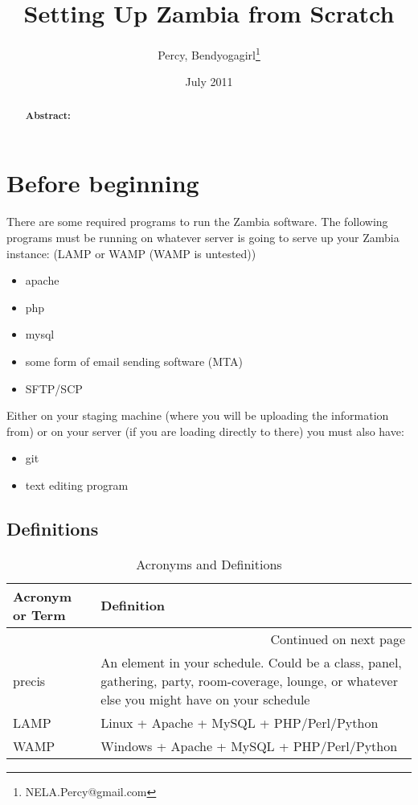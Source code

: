 \documentclass[captions=tablesignature]{scrartcl}
\author{Percy, Bendyogagirl\thanks{NELA.Percy@gmail.com}}
\date{July 2011}
\title{Setting Up Zambia from Scratch}
\begin{document}
\maketitle
{}
\thispagestyle{fancy}
\renewcommand{\headrulewidth}{0pt}
\renewcommand{\footrulewidth}{0pt}
\lhead{}
\rhead{}
\chead{}
\lfoot{}
\cfoot{}
\rfoot{}
\begin{abstract}
\vspace{5cm}
{\LARGE{\textbf{Abstract:\\}}}

\end{abstract}
\newpage
\renewcommand{\headrulewidth}{1pt}
\renewcommand{\footrulewidth}{1pt}
\rfoot{\thepage}
\setcounter{tocdepth}{3}
\tableofcontents
\listoftables
\listoffigures
\newpage
{}
\section{Before beginning}
\label{sec-1}

There are some required programs to run the Zambia software.  The
following programs must be running on whatever server is going to
serve up your Zambia instance: (LAMP or WAMP (WAMP is untested))
\begin{itemize}
\item apache
\item php
\item mysql
\item some form of email sending software (MTA)
\item SFTP/SCP
\end{itemize}

Either on your staging machine (where you will be uploading the
information from) or on your server (if you are loading directly to
there) you must also have:
\begin{itemize}
\item git
\item text editing program
\end{itemize}
\subsection{Definitions}
\label{sec-1-1}
\begin{longtable}{|p{3.5cm}|p{13.4cm}|}
\caption{\label{tbl:acronymsdefinitions}Acronyms and Definitions}
\\
\hline
Acronym or Term & Definition\\
\hline
\endhead
\hline\multicolumn{2}{r}{Continued on next page} \\
\endfoot
\endlastfoot
precis & An element in your schedule.  Could be a class, panel, gathering, party, room-coverage, lounge, or whatever else you might have on your schedule\\
LAMP & Linux + Apache + MySQL + PHP/Perl/Python\\
WAMP & Windows + Apache + MySQL + PHP/Perl/Python\\
\hline
\end{longtable}
\end{document}

